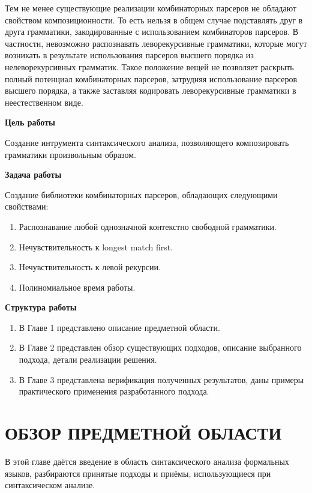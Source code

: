\documentclass[times]{itmo-student-thesis}
\begin{document}
Тем не менее существующие реализации комбинаторных парсеров  не обладают свойством композиционности. То есть нельзя в
общем случае подставлять друг в друга грамматики, закодированные с использованием комбинаторов парсеров. В частности,
невозможно распознавать леворекурсивные грамматики, которые могут возникать в результате использования парсеров высшего
порядка из нелеворекурсивных грамматик.  Такое положение вещей не позволяет раскрыть полный потенциал комбинаторных
парсеров, затрудняя использование парсеров высшего порядка, а также заставляя кодировать леворекурсивные грамматики в
неестественном виде.

\textbf{Цель работы}

Создание интрумента синтаксического анализа, позволяющего композировать грамматики произвольным образом. 

\textbf{Задача работы}

Создание библиотеки комбинаторных парсеров, обладающих следующими свойствами:

\begin{enumerate}
    \item Распознавание любой однозначной контекстно свободной грамматики.
    \item Нечувствительность к longest match first.
    \item Нечувствительность к левой рекурсии.
    \item Полиномиальное время работы.
\end{enumerate}

\textbf{Структура работы}

\begin{enumerate}
    \item В Главе 1 представлено описание предметной области.
    \item В Главе 2 представлен обзор существующих подходов, описание выбранного подхода, детали реализации решения.
    \item В Главе 3 представлена верификация полученных результатов, даны примеры практического применения 
    разработанного подхода.
\end{enumerate}

\chapter{ОБЗОР ПРЕДМЕТНОЙ ОБЛАСТИ}

В этой главе даётся введение в область синтаксического анализа формальных языков, разбираются принятые подходы и приёмы, 
использующиеся при синтаксическом анализе.
\end{document}
